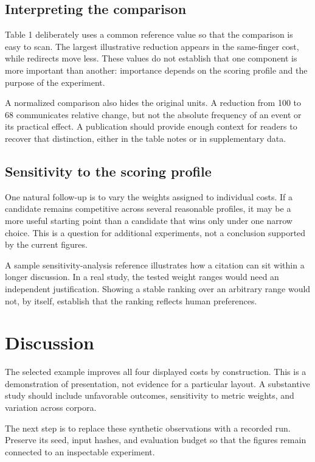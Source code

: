 \documentclass{gecko-paper}
\begin{document}
\begin{paperbody}
\subsection{Interpreting the comparison}

Table 1 deliberately uses a common reference value so that the comparison is easy to scan. The largest illustrative reduction appears in the same-finger cost, while redirects move less. These values do not establish that one component is more important than another: importance depends on the scoring profile and the purpose of the experiment.

A normalized comparison also hides the original units. A reduction from 100 to 68 communicates relative change, but not the absolute frequency of an event or its practical effect. A publication should provide enough context for readers to recover that distinction, either in the table notes or in supplementary data.

\subsection{Sensitivity to the scoring profile}

One natural follow-up is to vary the weights assigned to individual costs. If a candidate remains competitive across several reasonable profiles, it may be a more useful starting point than a candidate that wins only under one narrow choice. This is a question for additional experiments, not a conclusion supported by the current figures.

A sample sensitivity-analysis reference  illustrates how a citation can sit within a longer discussion. In a real study, the tested weight ranges would need an independent justification. Showing a stable ranking over an arbitrary range would not, by itself, establish that the ranking reflects human preferences.

\section{Discussion}
The selected example improves all four displayed costs by construction. This is a demonstration of presentation, not evidence for a particular layout. A substantive study should include unfavorable outcomes, sensitivity to metric weights, and variation across corpora.

The next step is to replace these synthetic observations with a recorded run. Preserve its seed, input hashes, and evaluation budget so that the figures remain connected to an inspectable experiment.


\end{paperbody}
\end{document}
